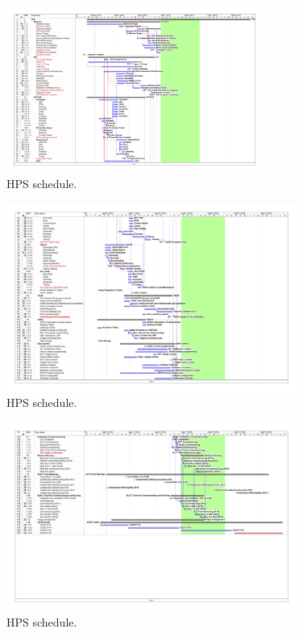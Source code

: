 \begin{figure}[H]
\centering
\includegraphics[angle=90,width=0.75\textwidth]{cost_schedule/ScheduleHPSV470-1.jpg} 
\caption{HPS schedule.}
\label{fig:schedulea}
\end{figure}

\begin{figure}[H]
\centering
\includegraphics[angle=90,width=0.85\textwidth]{cost_schedule/ScheduleHPSV470-2.jpg} 
\caption{HPS schedule.}
\label{fig:scheduleb}
\end{figure}

\begin{figure}[H]
\centering
\includegraphics[angle=90,width=0.85\textwidth]{cost_schedule/ScheduleHPSV470-3.jpg} 
\caption{HPS schedule.}
\label{fig:schedulec}
\end{figure}

